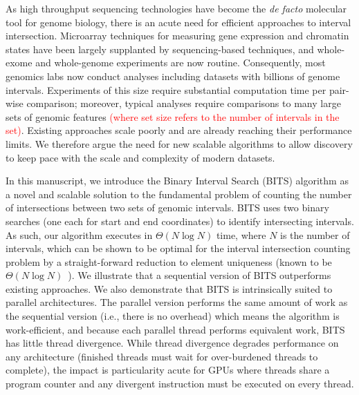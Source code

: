 \documentclass{bioinfo}
\begin{document}
As high throughput sequencing technologies have become the 
\emph{de facto} molecular tool for genome biology, there is an acute need for 
efficient approaches to interval intersection. Microarray
techniques for measuring gene expression and chromatin
states have been largely supplanted by sequencing-based techniques, 
and whole-exome and whole-genome
experiments are now routine. Consequently, most genomics labs now conduct
analyses including datasets with billions of genome intervals.
Experiments of this size require substantial computation time per pair-wise
comparison; moreover, typical analyses require comparisons to many large sets of
genomic features \textcolor{red} {(where set size refers to the number 
of intervals in the set)}. Existing approaches scale poorly and
are already reaching their performance limits. We therefore argue
the need for new scalable algorithms to allow discovery to keep pace with the
scale and complexity of modern datasets.

In this manuscript, we introduce the Binary Interval Search (BITS) algorithm as
a novel and scalable solution to the fundamental problem of counting the number
of intersections between two sets of genomic intervals.  BITS uses two binary searches (one each for start and end coordinates) to identify intersecting intervals. As such, our algorithm executes
in $\Theta(N \log N)$ time, where $N$ is the number of intervals, which can be
shown to be optimal for the interval intersection counting problem by a
straight-forward reduction to element uniqueness (known to be
$\Theta(N\log N)$~\citep{misra1982}).  We illustrate that a sequential version 
of BITS outperforms existing approaches. We also demonstrate that BITS 
is intrinsically suited to parallel architectures. The parallel 
version performs the same amount of work as the sequential version 
(i.e., there is no overhead) which means the algorithm is work-efficient, and 
because each parallel thread performs equivalent work, BITS has little thread 
divergence. While thread divergence degrades performance on any architecture 
(finished threads must wait for over-burdened threads to complete),
the impact is particularity acute for GPUs where threads share a program counter
and any divergent instruction must be executed on every thread.

\end{document}
